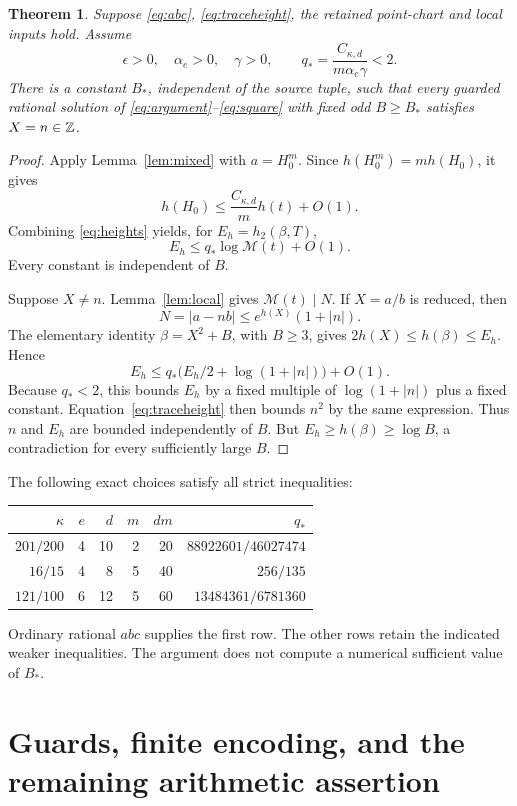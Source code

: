 \documentclass[11pt,a4paper]{article}
\newtheorem{theorem}{Theorem}[section]
\begin{document}
\begin{theorem}\label{thm:sound}
Suppose \eqref{eq:abc}, \eqref{eq:traceheight}, the retained point-chart
and local inputs hold. Assume
\[
 \epsilon>0,\quad \alpha_e>0,\quad \gamma>0,\qquad
 q_*=\frac{C_{\kappa,d}}{m\alpha_e\gamma}<2.
\]
There is a constant \(B_*\), independent of the source tuple, such that
every guarded rational solution of \eqref{eq:argument}--\eqref{eq:square}
with fixed odd \(B\ge B_*\) satisfies \(X=n\in\mathbb Z\).
\end{theorem}
\begin{proof}
Apply Lemma~\ref{lem:mixed} with \(a=H_0^m\).
Since \(h(H_0^m)=m h(H_0)\), it gives
\[
 h(H_0)\le\frac{C_{\kappa,d}}m h(t)+O(1).
\]
Combining \eqref{eq:heights} yields, for
\(E_h=h_2(\beta,T)\),
\[
 E_h\le q_*\log\mathcal M(t)+O(1).
\]
Every constant is independent of \(B\).

Suppose \(X\ne n\). Lemma~\ref{lem:local} gives
\(\mathcal M(t)\mid N\). If \(X=a/b\) is reduced, then
\[
 N=|a-nb|\le e^{h(X)}(1+|n|).
\]
The elementary identity \(\beta=X^2+B\), with \(B\ge3\), gives
\(2h(X)\le h(\beta)\le E_h\). Hence
\[
 E_h\le q_*\bigl(E_h/2+\log(1+|n|)\bigr)+O(1).
\]
Because \(q_*<2\), this bounds \(E_h\) by a fixed multiple of
\(\log(1+|n|)\) plus a fixed constant. Equation~\eqref{eq:traceheight}
then bounds \(n^2\) by the same expression. Thus \(n\) and \(E_h\)
are bounded independently of \(B\). But
\(E_h\ge h(\beta)\ge\log B\), a contradiction for every sufficiently
large \(B\).
\end{proof}

The following exact choices satisfy all strict inequalities:
\begin{center}
\begin{tabular}{rrrrrr}\toprule
\(\kappa\)&\(e\)&\(d\)&\(m\)&\(dm\)&\(q_*\)\\\midrule
\(201/200\)&4&10&2&20&\(88922601/46027474\)\\
\(16/15\)&4&8&5&40&\(256/135\)\\
\(121/100\)&6&12&5&60&\(13484361/6781360\)\\\bottomrule
\end{tabular}
\end{center}
Ordinary rational \(abc\) supplies the first row. The other rows retain
the indicated weaker inequalities. The argument does not compute a
numerical sufficient value of \(B_*\).

\section{Guards, finite encoding, and the remaining arithmetic assertion}
\end{document}
